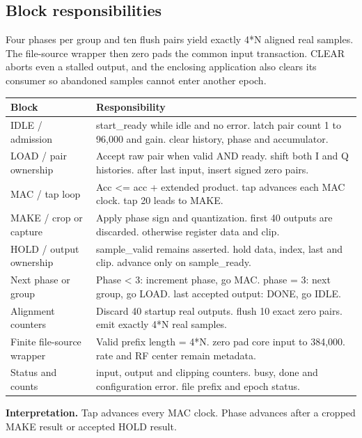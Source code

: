 \documentclass[11pt,letterpaper]{article}
\begin{document}
\subsection*{Block responsibilities}
Four phases per group and ten flush pairs yield exactly 4*N aligned real samples. The file-source wrapper then zero pads the common input transaction. CLEAR aborts even a stalled output, and the enclosing application also clears its consumer so abandoned samples cannot enter another epoch.
\par\medskip\noindent
\begin{tabularx}{\linewidth}{@{}>{\raggedright\arraybackslash}p{1.65in}Y@{}}\toprule
\textbf{Block} & \textbf{Responsibility} \\ \midrule
IDLE / admission & start\_ready while idle and no error. latch pair count 1 to 96,000 and gain. clear history, phase and accumulator. \\[5pt]
LOAD / pair ownership & Accept raw pair when valid AND ready. shift both I and Q histories. after last input, insert signed zero pairs. \\[5pt]
MAC / tap loop & Acc <= acc + extended product. tap advances each MAC clock. tap 20 leads to MAKE. \\[5pt]
MAKE / crop or capture & Apply phase sign and quantization. first 40 outputs are discarded. otherwise register data and clip. \\[5pt]
HOLD / output ownership & sample\_valid remains asserted. hold data, index, last and clip. advance only on sample\_ready. \\[5pt]
Next phase or group & Phase < 3: increment phase, go MAC. phase = 3: next group, go LOAD. last accepted output: DONE, go IDLE. \\[5pt]
Alignment counters & Discard 40 startup real outputs. flush 10 exact zero pairs. emit exactly 4*N real samples. \\[5pt]
Finite file-source wrapper & Valid prefix length = 4*N. zero pad core input to 384,000. rate and RF center remain metadata. \\[5pt]
Status and counts & input, output and clipping counters. busy, done and configuration error. file prefix and epoch status. \\[5pt]
\bottomrule\end{tabularx}
\vspace{8pt}
\noindent\textbf{Interpretation.} Tap advances every MAC clock. Phase advances after a cropped MAKE result or accepted HOLD result.
\clearpage
\end{document}
